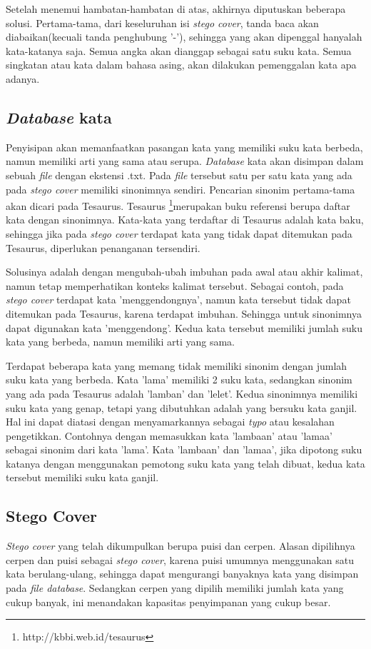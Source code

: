 Setelah menemui hambatan-hambatan di atas, akhirnya diputuskan beberapa solusi. Pertama-tama, dari keseluruhan isi \textit{stego cover}, tanda baca akan diabaikan(kecuali tanda penghubung '-'), sehingga yang akan dipenggal hanyalah kata-katanya saja. Semua angka akan dianggap sebagai satu suku kata. Semua singkatan atau kata dalam bahasa asing, akan dilakukan pemenggalan kata apa adanya.

\subsection{\textit{Database} kata}
Penyisipan akan memanfaatkan pasangan kata yang memiliki suku kata berbeda, namun memiliki arti yang sama atau serupa. \textit{Database} kata akan disimpan dalam sebuah \textit{file} dengan ekstensi .txt. Pada \textit{file} tersebut satu per satu kata yang ada pada \textit{stego cover} memiliki sinonimnya sendiri. Pencarian sinonim pertama-tama akan dicari pada Tesaurus. Tesaurus \footnote{http://kbbi.web.id/tesaurus}merupakan buku referensi berupa daftar kata dengan sinonimnya. Kata-kata yang terdaftar di Tesaurus adalah kata baku, sehingga jika pada \textit{stego cover} terdapat kata yang tidak dapat ditemukan pada Tesaurus, diperlukan penanganan tersendiri.

Solusinya adalah dengan mengubah-ubah imbuhan pada awal atau akhir kalimat, namun tetap memperhatikan konteks kalimat tersebut. Sebagai contoh, pada \textit{stego cover} terdapat kata 'menggendongnya', namun kata tersebut tidak dapat ditemukan pada Tesaurus, karena terdapat imbuhan. Sehingga untuk sinonimnya dapat digunakan kata 'menggendong'. Kedua kata tersebut memiliki jumlah suku kata yang berbeda, namun memiliki arti yang sama.

Terdapat beberapa kata yang memang tidak memiliki sinonim dengan jumlah suku kata yang berbeda. Kata 'lama' memiliki 2 suku kata, sedangkan sinonim yang ada pada Tesaurus adalah 'lamban' dan 'lelet'. Kedua sinonimnya memiliki suku kata yang genap, tetapi yang dibutuhkan adalah yang bersuku kata ganjil. Hal ini dapat diatasi dengan menyamarkannya sebagai \textit{typo} atau kesalahan pengetikkan. Contohnya dengan memasukkan kata 'lambaan' atau 'lamaa' sebagai sinonim dari kata 'lama'. Kata 'lambaan' dan 'lamaa', jika dipotong suku katanya dengan menggunakan pemotong suku kata yang telah dibuat, kedua kata tersebut memiliki suku kata ganjil.

\subsection{Stego Cover}
\textit{Stego cover} yang telah dikumpulkan berupa puisi dan cerpen. Alasan dipilihnya cerpen dan puisi sebagai \textit{stego cover}, karena puisi umumnya menggunakan satu kata berulang-ulang, sehingga dapat mengurangi banyaknya kata yang disimpan pada \textit{file database}. Sedangkan cerpen yang dipilih memiliki jumlah kata yang cukup banyak, ini menandakan kapasitas penyimpanan yang cukup besar.


